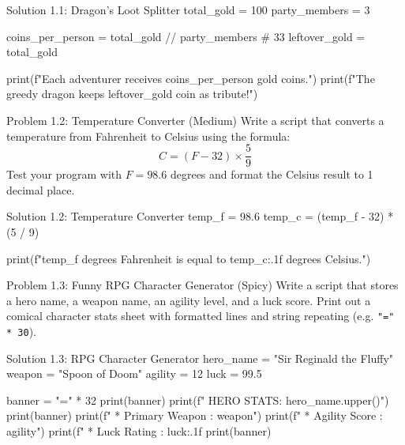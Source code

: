 \begin{pycode}{Solution 1.1: Dragon's Loot Splitter}
total_gold = 100
party_members = 3

coins_per_person = total_gold // party_members  # 33
leftover_gold = total_gold %

print(f"Each adventurer receives {coins_per_person} gold coins.")
print(f"The greedy dragon keeps {leftover_gold} coin as tribute!")
\end{pycode}

\begin{snakelab}{Problem 1.2: Temperature Converter (Medium)}
Write a script that converts a temperature from Fahrenheit to Celsius using the formula:
\[ C = (F - 32) \times \frac{5}{9} \]
Test your program with $F = 98.6$ degrees and format the Celsius result to 1 decimal place.
\end{snakelab}

\begin{pycode}{Solution 1.2: Temperature Converter}
temp_f = 98.6
temp_c = (temp_f - 32) * (5 / 9)

print(f"{temp_f} degrees Fahrenheit is equal to {temp_c:.1f} degrees Celsius.")
\end{pycode}

\begin{snakelab}{Problem 1.3: Funny RPG Character Generator (Spicy)}
Write a script that stores a hero name, a weapon name, an agility level, and a luck score. 
Print out a comical character stats sheet with formatted lines and string repeating (e.g. \texttt{"=" * 30}).
\end{snakelab}

\begin{pycode}{Solution 1.3: RPG Character Generator}
hero_name = "Sir Reginald the Fluffy"
weapon = "Spoon of Doom"
agility = 12
luck = 99.5

banner = "=" * 32
print(banner)
print(f" HERO STATS: {hero_name.upper()}")
print(banner)
print(f" * Primary Weapon : {weapon}")
print(f" * Agility Score  : {agility}")
print(f" * Luck Rating    : {luck:.1f}%
print(banner)
\end{pycode}
